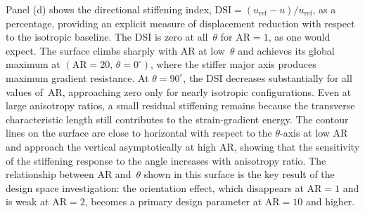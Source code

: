 \documentclass[final,3p,times,fleqn]{elsarticle}
\begin{document}
Panel (d) shows the directional stiffening index,
$\mathrm{DSI} = (u_{\mathrm{ref}} - u)/u_{\mathrm{ref}}$,
as a percentage, providing an explicit measure of displacement reduction
with respect to the isotropic baseline. The DSI is zero at all~$\theta$
for $\mathrm{AR}=1$, as one would expect. The surface climbs sharply with
AR at low~$\theta$ and achieves its global maximum at
$(\mathrm{AR}=20,\,\theta = 0^{\circ})$, where the stiffer major axis
produces maximum gradient resistance.
At $\theta = 90^{\circ}$, the DSI decreases substantially for all
values of~AR, approaching zero only for nearly isotropic
configurations. Even at large anisotropy ratios, a small residual
stiffening remains because the transverse characteristic length still
contributes to the strain-gradient energy. The contour lines on the surface are close to horizontal with respect
to the $\theta$-axis at low AR and approach the vertical asymptotically
at high AR, showing that the sensitivity of the stiffening response to
the angle increases with anisotropy ratio.
The relationship between AR and~$\theta$ shown in this surface is the
key result of the design space investigation: the orientation effect,
which disappears at $\mathrm{AR}=1$ and is weak at $\mathrm{AR}=2$,
becomes a primary design parameter at $\mathrm{AR}=10$ and higher.
\end{document}
